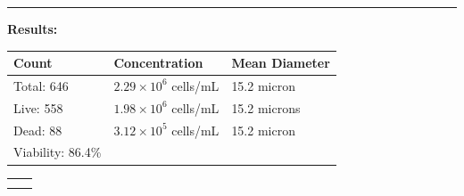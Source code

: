 \documentclass[UTF8,10pt,a4paper,fontset=fandol]{ctexart}
\newcommand{\fieldvalue}[1]{#1}
\begin{document}
\vspace{1em}
\hrule
\vspace{0.5em}

\noindent
\textbf{Results:}

\vspace{0.5em}

\begin{tabularx}{\textwidth}{@{}XXX@{}}
\textbf{Count} & \textbf{Concentration} & \textbf{Mean Diameter} \\
\hline
Total:
\fieldvalue{646}
&
\fieldvalue{$2.29 \times 10^{6}$ cells/mL}
&
\fieldvalue{15.2 micron}
\\[0.35em]

Live:
\fieldvalue{558}
&
\fieldvalue{$1.98 \times 10^{6}$ cells/mL}
&
\fieldvalue{15.2 microns}
\\[0.35em]

Dead:
\fieldvalue{88}
&
\fieldvalue{$3.12 \times 10^{5}$ cells/mL}
&
\fieldvalue{15.2 micron}
\\[0.35em]

Viability:
\fieldvalue{86.4\%}
&
&
\end{tabularx}

\vspace{1em}

\noindent
\begin{center}
\setlength{\fboxsep}{0pt}
\begin{tabular}{cc}
\fbox{\rule{0pt}{0.22\textheight}\rule{0.44\textwidth}{0pt}} &
\fbox{\rule{0pt}{0.22\textheight}\rule{0.44\textwidth}{0pt}} \\[1em]
\fbox{\rule{0pt}{0.22\textheight}\rule{0.44\textwidth}{0pt}} &
\fbox{\rule{0pt}{0.22\textheight}\rule{0.44\textwidth}{0pt}}
\end{tabular}
\end{center}
\end{document}
